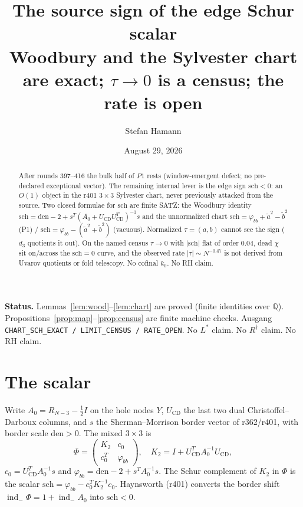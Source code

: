 \documentclass[11pt]{article}
\title{\bfseries The source sign of the edge Schur scalar\\[2mm]
\large Woodbury and the Sylvester chart are exact;
$\tau\to 0$ is a census; the rate is open}
\author{Stefan Hamann}
\date{August 29, 2026}
\theoremstyle{remark}
\newcommand{\indm}{\operatorname{ind}_{-}}
\newcommand{\sch}{\mathrm{sch}}
\begin{document}
\maketitle

\begin{abstract}\noindent
After rounds 397--416 the bulk half of $P1$ rests
(window-emergent defect; no pre-declared exceptional vector).
The remaining internal lever is the edge sign $\sch<0$:
an $O(1)$ object in the r401 $3\times 3$ Sylvester chart,
never previously attacked from the source.
Two closed formulae for $\sch$ are finite SATZ:
the Woodbury identity
$\sch=\mathrm{den}-2+s^{T}(A_{0}+U_{\mathrm{CD}}U_{\mathrm{CD}}^{T})^{-1}s$
and the unnormalized chart
$\sch=\varphi_{bb}+\tilde a^{2}-\tilde b^{2}$ (P1) /
$\sch=\varphi_{bb}-(\tilde a^{2}+\tilde b^{2})$ (vacuous).
Normalized $\tau=(a,b)$ cannot see the sign ($d_{3}$ quotients
it out).  On the named census $\tau\to 0$ with $|\sch|$ flat
of order $0.04$, dead $\chi$ sit on/across the $\sch=0$ curve,
and the observed rate $|\tau|\sim N^{-0.47}$ is not derived
from Uvarov quotients or fold telescopy.
No cofinal $k_{0}$.  No RH claim.
\end{abstract}

\medskip\noindent
\textbf{Status.}\enspace
Lemmas~\ref{lem:wood}--\ref{lem:chart} are proved (finite
identities over $\mathbb{Q}$).
Propositions~\ref{prop:map}--\ref{prop:census} are finite
machine checks.
Ausgang \texttt{CHART\_SCH\_EXACT / LIMIT\_CENSUS / RATE\_OPEN}.
No $L^{*}$ claim.  No $R^{\dagger}$ claim.  No RH claim.

\section{The scalar}\label{sec:obj}

Write $A_{0}=R_{N-3}-\tfrac12 I$ on the hole nodes $Y$,
$U_{\mathrm{CD}}$ the last two dual Christoffel--Darboux
columns, and $s$ the Sherman--Morrison border vector of
r362/r401, with border scale $\mathrm{den}>0$.
The mixed $3\times 3$ is
\[
\Phi
=\begin{pmatrix} K_{2} & c_{0}\\ c_{0}^{T} & \varphi_{bb}\end{pmatrix},
\quad
K_{2}=I+U_{\mathrm{CD}}^{T}A_{0}^{-1}U_{\mathrm{CD}},
\]
$c_{0}=U_{\mathrm{CD}}^{T}A_{0}^{-1}s$ and
$\varphi_{bb}=\mathrm{den}-2+s^{T}A_{0}^{-1}s$.
The Schur complement of $K_{2}$ in $\Phi$ is the scalar
$\sch=\varphi_{bb}-c_{0}^{T}K_{2}^{-1}c_{0}$.
Haynsworth (r401) converts the border shift
$\indm\Phi=1+\indm A_{0}$ into $\sch<0$.
\end{document}
